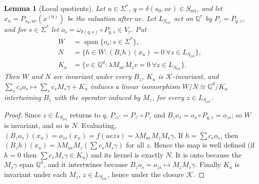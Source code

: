 \documentclass[11pt,letterpaper]{article}
\newcommand{\Q}{\mathbb{Q}}
\newcommand{\cK}{\mathcal{K}}
\newcommand{\spn}{\operatorname{span}}
\newtheorem{lemma}[theorem]{Lemma}
\theoremstyle{definition}
\begin{document}
\begin{lemma}[Local quotients]\label{lem:local}
Let $u\in\Sigma^*$, $q=\delta(s_0,ue)\in {S_{\mathrm{ret}}}$, and let $x_u=P_{s_0,ue}(x^{(0)})$ be the valuation after $ue$. Let $L_{S_{\mathrm{ret}}}$ act on $\Q^r$ by $P_z=P_{q,z}$, and for $s\in\Sigma^*$ let $o_s=\omega_{\delta(q,s)}\circ P_{q,s}\in V_r$. Put
\[
\begin{aligned}
W&=\spn\{o_s:s\in\Sigma^*\},\\
N&=\{h\in W:(B_zh)(x_u)=0\ \forall z\in L_{S_{\mathrm{ret}}}\},\\
K_u&=\{v\in\Q^d:\lambda M_{ue}M_zv=0\ \forall z\in L_{S_{\mathrm{ret}}}\}.
\end{aligned}
\]
Then $W$ and $N$ are invariant under every $B_z$, $K_u$ is $\cK$-invariant, and $\sum_sc_so_s\mapsto\sum_sc_sM_s\gamma+K_u$ induces a linear isomorphism $W/N\cong\Q^d/K_u$ intertwining $B_z$ with the operator induced by $M_z$, for every $z\in L_{S_{\mathrm{ret}}}$.
\end{lemma}
\begin{proof}
Since $z\in L_{S_{\mathrm{ret}}}$ returns to $q$, $P_{zz'}=P_{z'}\circ P_z$ and $B_zo_s=o_s\circ P_{q,z}=o_{zs}$; so $W$ is invariant, and so is $N$. Evaluating, $(B_zo_s)(x_u)=o_{zs}(x_u)=f(uezs)=\lambda M_{ue}M_zM_s\gamma$. If $h=\sum c_so_s$, then $(B_zh)(x_u)=\lambda M_{ue}M_z(\sum c_sM_s\gamma)$ for all $z$. Hence the map is well defined (if $h=0$ then $\sum c_sM_s\gamma\in K_u$) and its kernel is exactly $N$. It is onto because the $M_s\gamma$ span $\Q^d$, and it intertwines because $B_zo_s=o_{zs}\mapsto M_zM_s\gamma$. Finally $K_u$ is invariant under each $M_z$, $z\in L_{S_{\mathrm{ret}}}$, hence under the closure $\cK$.
\end{proof}
\end{document}
